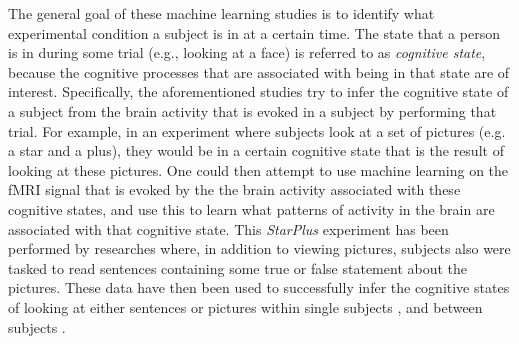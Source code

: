 \documentclass[preprint,journal,11pt]{vgtc}
\begin{document}
The general goal of these machine learning studies is to identify what experimental condition a subject is in at a certain time. The state that a person is in during some trial (e.g., looking at a face) is referred to as \emph{cognitive state}, because the cognitive processes that are associated with being in that state are of interest. Specifically, the aforementioned studies try to infer the cognitive state of a subject from the brain activity that is evoked in a subject by performing that trial. For example, in an experiment where subjects look at a set of pictures (e.g. a star and a plus), they would be in a certain cognitive state that is the result of looking at these pictures. One could then attempt to use machine learning on the fMRI signal that is evoked by the the brain activity associated with these cognitive states, and use this to learn what patterns of activity in the brain are associated with that cognitive state. This \emph{StarPlus} experiment has been performed by researches where, in addition to viewing pictures, subjects also were tasked to read sentences containing some true or false statement about the pictures. These data have then been used to successfully infer the cognitive states of looking at either sentences or pictures within single subjects \cite{mi:2003within}, and between subjects \cite{wa:2003betw}.\\
\end{document}
